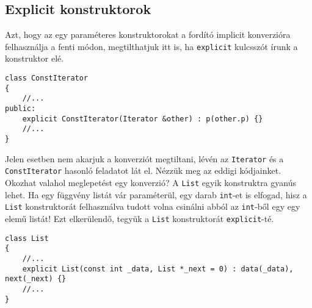 \documentclass[a4paper,11.5pt,table]{article}
\begin{document}
	\subsection{Explicit konstruktorok}
	Azt, hogy az egy paraméteres konstruktorokat a fordító implicit konverzióra felhasználja a fenti módon, megtilthatjuk itt is, ha \texttt{explicit} kulcsszót írunk a konstruktor elé.
	
\begin{lstlisting}
class ConstIterator
{
	//...
public:
	explicit ConstIterator(Iterator &other) : p(other.p) {}
	//...
}
\end{lstlisting}
	Jelen esetben nem akarjuk a konverziót megtiltani, lévén az \texttt{Iterator} és a \texttt{ConstIterator} hasonló feladatot lát el. Nézzük meg az eddigi kódjainket. Okozhat valahol meglepetést egy konverzió? A \texttt{List} egyik konstruktra gyanús lehet. Ha egy függvény listát vár paraméterül, egy darab \texttt{int}-et is elfogad, hisz a \texttt{List} konstruktorát felhasználva tudott volna csinálni abból az \texttt{int}-ből egy egy elemű listát! Ezt elkerülendő, tegyük a \texttt{List} konstruktorát \texttt{explicit}-té.
	\begin{lstlisting}
class List
{
	//...
	explicit List(const int _data, List *_next = 0) : data(_data), next(_next) {}
	//...
}
	\end{lstlisting}
\end{document}
